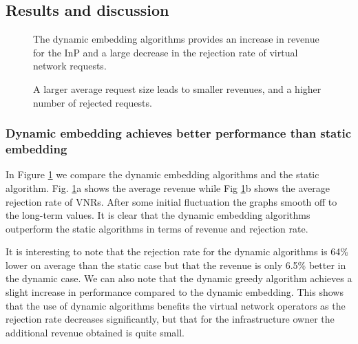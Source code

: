 \documentclass[conference]{IEEEtran}
\begin{document}
\subsection{Results and discussion}

\begin{figure}[!t]
\centering
  \hfill
  \hfill
  \caption{The dynamic embedding algorithms provides an increase in revenue for the InP and a large decrease in the rejection rate of virtual network requests.}\label{fig:3}
\end{figure}

\begin{figure}[!t]
\centering
 \hfill
  \hfill
  \caption{A larger average request size leads to smaller revenues, and a higher number of rejected requests.}\label{fig:5}

\end{figure}



\subsubsection{Dynamic embedding achieves better performance than static embedding}In Figure \ref{fig:3} we compare the dynamic embedding algorithms and the static algorithm. Fig. \ref{fig:3}a shows the average revenue while Fig \ref{fig:3}b shows the average rejection rate of VNRs. After some initial fluctuation the graphs smooth off to the long-term values. It is clear that the dynamic embedding algorithms outperform the static algorithms in terms of revenue and rejection rate.

It is interesting to note that the rejection rate for the dynamic algorithms is 64\% lower on average than the static case but that the revenue is only 6.5\% better in the dynamic case. We can also note that the dynamic greedy algorithm achieves a slight increase in performance compared to the dynamic embedding. This shows that the use of dynamic algorithms benefits the virtual network operators as the rejection rate decreases significantly, but that for the infrastructure owner the additional revenue obtained is quite small.
\end{document}
